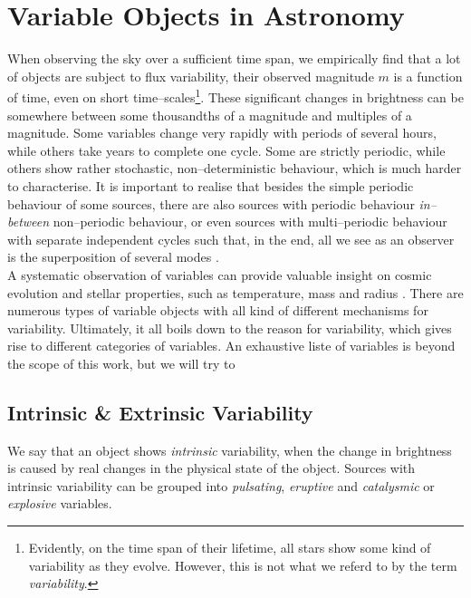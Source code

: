 \section{Variable Objects in Astronomy}
\label{sec:theory-variable-objects}

When observing the sky over a sufficient time span, we empirically find that a lot of objects are subject to flux variability, \ie their observed magnitude $m$ is a function of time, even on short time--scales\footnote{Evidently, on the time span of their lifetime, all stars show some kind of variability as they evolve. However, this is not what we referd to by the term \emph{variability}.}. These significant changes in brightness can be somewhere between some thousandths of a magnitude and multiples of a magnitude. Some variables change very rapidly with periods of several hours, while others take years to complete one cycle. Some are strictly periodic, while others show rather stochastic, non--deterministic behaviour, which is much harder to characterise. It is important to realise that besides the simple periodic behaviour of some sources, there are also sources with periodic behaviour \emph{in--between} non--periodic behaviour, or even sources with multi--periodic behaviour with separate independent cycles such that, in the end, all we see as an observer is the superposition of several modes \citep{hanslmeier2007}.\\

A systematic observation of variables can provide valuable insight on cosmic evolution and stellar properties, such as temperature, mass and radius \citep{percy2007}. There are numerous types of variable objects with all kind of different mechanisms for variability. Ultimately, it all boils down to the reason for variability, which gives rise to different categories of variables. An exhaustive liste of variables is beyond the scope of this work, but we will try to 

\subsection{Intrinsic \& Extrinsic Variability}
\label{subsec:intrinsic-extrinsic-variability}

We say that an object shows \emph{intrinsic} variability, when the change in brightness is caused by real changes in the physical state of the object. Sources with intrinsic variability can be grouped into \emph{pulsating}, \emph{eruptive} and \emph{catalysmic} or \emph{explosive} variables.

